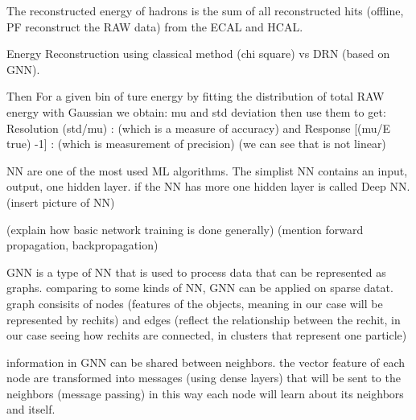 
The reconstructed energy of hadrons is the sum of all reconstructed hits (offline, PF reconstruct the RAW data) from the ECAL and HCAL.

Energy Reconstruction using classical  method (chi square) vs DRN (based on GNN).

Then For a given bin of ture energy
by fitting the distribution of total RAW energy with Gaussian we obtain: mu and std deviation then use them to get:
Resolution (std/mu) : (which is a measure of accuracy)
and Response [(mu/E true) -1] : (which is measurement of precision) (we can see that is not linear)



NN are one of the most used ML algorithms.
The simplist NN contains an input, output, one hidden layer.
if the NN has more one hidden layer is called Deep NN. 
(insert picture of NN) 

(explain how basic network training is done generally)
(mention forward propagation, backpropagation)

GNN is a type of NN that is used to process data that can be represented as graphs.
comparing to some kinds of NN,  GNN can be applied on sparse datat.
graph consisits of nodes (features of the objects, meaning in our case will be represented by rechits)
and edges (reflect the relationship between the rechit, in our case seeing how rechits are connected, in clusters that represent one particle)

information in GNN can be shared between neighbors.
the vector feature of each node are transformed into messages (using dense layers) that will be sent to the neighbors (message passing)
in this way each node will learn about its neighbors and itself.

